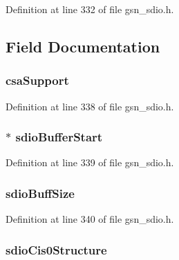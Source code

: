 Definition at line 332 of file gsn\_\-sdio.h.



\subsection{Field Documentation}
\hypertarget{a00226_a4bbd188d8ec8abec6fc23bb193fd9424}{
\subsubsection[{csaSupport}]{ {\bf csaSupport}}}
\label{a00226_a4bbd188d8ec8abec6fc23bb193fd9424}


Definition at line 338 of file gsn\_\-sdio.h.

\hypertarget{a00226_a449e4955b6dc1e05ba6b00e90ba4221b}{
\subsubsection[{sdioBufferStart}]{$\ast$ {\bf sdioBufferStart}}}
\label{a00226_a449e4955b6dc1e05ba6b00e90ba4221b}


Definition at line 339 of file gsn\_\-sdio.h.

\hypertarget{a00226_ad8a0bf8777517ff38b32e8a32c02b64d}{
\subsubsection[{sdioBuffSize}]{ {\bf sdioBuffSize}}}
\label{a00226_ad8a0bf8777517ff38b32e8a32c02b64d}


Definition at line 340 of file gsn\_\-sdio.h.

\hypertarget{a00226_a0bf26a6eea35d59f303591cd6501afa0}{
\subsubsection[{sdioCis0Structure}]{ {\bf sdioCis0Structure}}}
\label{a00226_a0bf26a6eea35d59f303591cd6501afa0}


